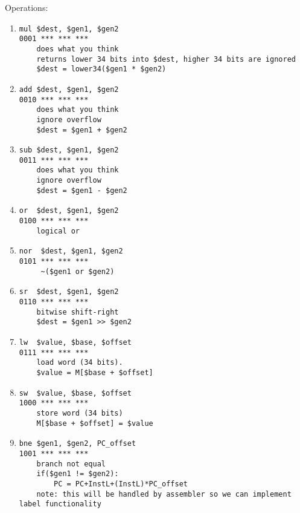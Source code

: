 \documentclass{article}
\begin{document}
Operations:
\begin{enumerate}
\item 
\begin{verbatim}
mul $dest, $gen1, $gen2
0001 *** *** ***
    does what you think
    returns lower 34 bits into $dest, higher 34 bits are ignored
    $dest = lower34($gen1 * $gen2)

\end{verbatim}
\item 
\begin{verbatim}
add $dest, $gen1, $gen2
0010 *** *** ***
    does what you think
    ignore overflow
    $dest = $gen1 + $gen2

\end{verbatim}
\item 
\begin{verbatim}
sub $dest, $gen1, $gen2
0011 *** *** ***
    does what you think
    ignore overflow
    $dest = $gen1 - $gen2

\end{verbatim}
\item 
\begin{verbatim}
or  $dest, $gen1, $gen2
0100 *** *** ***
    logical or

\end{verbatim}
\item 
\begin{verbatim}
nor  $dest, $gen1, $gen2
0101 *** *** ***
     ~($gen1 or $gen2)

\end{verbatim}
\item 
\begin{verbatim}
sr  $dest, $gen1, $gen2
0110 *** *** ***
    bitwise shift-right
    $dest = $gen1 >> $gen2

\end{verbatim}
\item 
\begin{verbatim}
lw  $value, $base, $offset
0111 *** *** ***
    load word (34 bits).
    $value = M[$base + $offset]

\end{verbatim}
\item 
\begin{verbatim}
sw  $value, $base, $offset
1000 *** *** ***
    store word (34 bits)
    M[$base + $offset] = $value

\end{verbatim}
\item 
\begin{verbatim}
bne $gen1, $gen2, PC_offset
1001 *** *** ***
    branch not equal
    if($gen1 != $gen2):
        PC = PC+InstL+(InstL)*PC_offset
    note: this will be handled by assembler so we can implement label functionality


\end{verbatim}
\end{enumerate}
\end{document}
